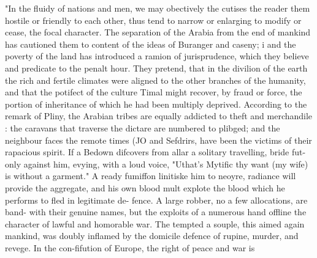 "In the fluidy of nations and men, we may obectively the cutises the reader them hostile or friendly to each other, thus tend to narrow or enlarging to modify or cease, the focal character. The separation of the Arabia from the end of mankind has cautioned them to content of the ideas of Buranger and caseny; i and the poverty of the land has introduced a ramion of jurisprudence, which they believe and predicate to the penalt hour. They pretend, that in the divilion of the earth the rich and fertile climates were aligned to the other branches of the humanity, and that the potifect of the culture Timal might recover, by fraud or force, the portion of inheritance of which he had been multiply deprived. According to the remark of Pliny, the Arabian tribes are equally addicted to theft and merchandile : the caravans that traverse the dictare are numbered to plibged; and the neighbour faces the remote times (JO and Sefdrirs, have been the victims of their rapacious spirit. If a Bedown difcovers from allar a solitary travelling, bride fut-only against him, evying, with a loud voice, "Uthat's Mytific thy want (my wife) is without a garment." A ready fumiffon linitiske him to neoyre, radiance will provide the aggregate, and his own blood mult explote the blood which he performs to fled in legitimate de- fence. A large robber, no a few allocations, are band- with their genuine names, but the exploits of a numerous hand offline the character of lawful and homorable war. The tempted a souple, this aimed again mankind, was doubly inflamed by the domicile defence of rupine, murder, and revege. In the con-fifution of Europe, the right of peace and war is\par\medskip
